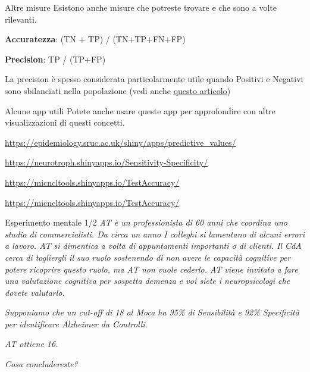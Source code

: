 \documentclass[
  ignorenonframetext,
]{beamer}
\begin{document}
\begin{frame}{Altre misure}
\label{altre-misure}
Esistono anche misure che potreste trovare e che sono a volte rilevanti.

\textbf{Accuratezza}: (TN + TP) / (TN+TP+FN+FP)

\textbf{Precision}: TP / (TP+FP)

La precision è spesso considerata particolarmente utile quando Positivi
e Negativi sono sbilanciati nella popolazione (vedi anche
\href{https://journals.plos.org/plosone/article?id=10.1371/journal.pone.0118432}{\underline{questo articolo}})
\end{frame}

\begin{frame}{Alcune app utili}
\label{alcune-app-utili}
Potete anche usare queste app per approfondire con altre visualizzazioni
di questi concetti.

\color{blue}

\url{https://epidemiology.sruc.ac.uk/shiny/apps/predictive_values/}

\url{https://neurotroph.shinyapps.io/Sensitivity-Specificity/}

\url{https://micncltools.shinyapps.io/TestAccuracy/}

\url{https://micncltools.shinyapps.io/TestAccuracy/}
\end{frame}

\begin{frame}{Esperimento mentale 1/2}
\label{esperimento-mentale-12}
\emph{AT è un professionista di 60 anni che coordina uno studio di
commercialisti. Da circa un anno I colleghi si lamentano di alcuni
errori a lavoro. AT si dimentica a volta di appuntamenti importanti o di
clienti. Il CdA cerca di togliergli il suo ruolo sostenendo di non avere
le capacità cognitive per potere ricoprire questo ruolo, ma AT non vuole
cederlo. AT viene invitato a fare una valutazione cognitiva per sospetta
demenza e voi siete i neuropsicologi che dovete valutarlo. }

\emph{Supponiamo che un cut-off di 18 al Moca ha 95\% di Sensibilità e
92\% Specificità per identificare Alzheimer da Controlli.}

\pause

\emph{AT ottiene 16.}

\emph{Cosa concludereste?}
\end{frame}
\end{document}
